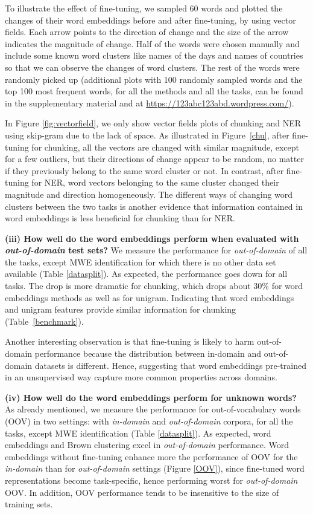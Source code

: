 To illustrate the effect of fine-tuning, we sampled 60 words and plotted the changes of their word embeddings before and after fine-tuning, by using vector fields. Each arrow points to the direction of change and the size of the arrow indicates the magnitude of change.  Half of the words were chosen manually and include some known word clusters like names of the days and names of countries so that we can observe the changes of word clusters.  The rest of the words were randomly picked up (additional plots with 100 randomly sampled words and the top 100 most frequent words, for all the methods and all the tasks, can be found in the supplementary material and at \url{https://123abc123abd.wordpress.com/}).

In Figure \ref{fig:vectorfield}, we only show vector fields plots of chunking and NER using skip-gram due to the lack of space.
As illustrated in Figure~\ref{chu}, after fine-tuning for chunking, all the vectors are changed with similar magnitude, except for a few outliers, but their directions of change appear to be random, no matter if they previously belong to the same word cluster or not. In contrast, after fine-tuning for NER, word vectors belonging to the same cluster changed their magnitude and direction homogeneously. The different ways of changing word clusters between the two tasks is another evidence that information contained in word embeddings is less beneficial for chunking than for NER. 

\textbf{(iii) How well do the word embeddings perform when evaluated with \textit{out-of-domain} test sets?}
We measure the performance for \textit{out-of-domain} of all the tasks, except MWE identification for which there is no other data set available (Table \ref{datasplit}).
As expected, the performance goes down for all tasks. The drop is more dramatic for chunking, which drops about 30\% for word embeddings methods as well as for unigram. 
Indicating that word embeddings and unigram features provide similar information 
for chunking (Table~\ref{benchmark}). 

Another interesting observation is that fine-tuning is likely to harm out-of-domain performance because the distribution between in-domain and out-of-domain datasets is different. Hence, suggesting that word embeddings pre-trained in an unsupervised way capture more common properties across domains. 

\textbf{(iv) How well do the word embeddings perform for unknown words?}
As already mentioned, we measure the performance for out-of-vocabulary words (OOV)
in two settings: with \textit{in-domain} and \textit{out-of-domain} corpora, for all the tasks, except MWE identification (Table \ref{datasplit}).
As expected, word embeddings and Brown clustering excel in \textit{out-of-domain} performance.
Word embeddings without fine-tuning enhance more the performance of OOV 
for the \textit{in-domain} than for \textit{out-of-domain} settings (Figure \ref{OOV}), since fine-tuned
word representations become task-specific, hence performing worst for \textit{out-of-domain} OOV. In addition, OOV performance tends to be insensitive to the size of training sets.


